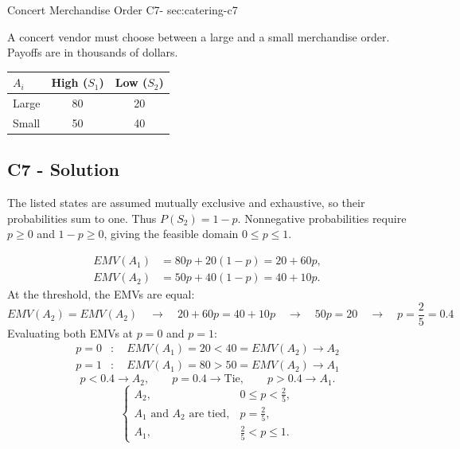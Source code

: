 \sectionScored
	{Concert Merchandise Order}
	{C7-}
	{sec:catering-c7}
	{
	\label{sec:c7-exam-solutions}
	A concert vendor must choose between a large and a small merchandise order. Payoffs are in thousands of dollars.
		\begin{center}\setlength{\tabcolsep}{4pt}\renewcommand{\arraystretch}{1.15}
			\begin{tabular}{lcc}\toprule
			$A_i$&High ($S_1$)&Low ($S_2$)\\ \midrule
			Large &80&20\\
			Small &50&40\\ \bottomrule
			\end{tabular}
		\end{center}


	\label{subsec:catering-c7-solution}
	\subsection*{C7 - Solution }
	
	The listed states are assumed mutually exclusive and exhaustive, so their probabilities sum to one. Thus $P(S_2)=1-p$. Nonnegative probabilities require $p\ge0$ and $1-p\ge0$, giving the feasible domain $0\le p\le1$.

		\begin{align*}
EMV(A_1)&=80p+20(1-p)=20+60p,\\
			EMV(A_2)&=50p+40(1-p)=40+10p.
		\end{align*}
		At the threshold, the EMVs are equal:
		\[
		EMV(A_2) = EMV(A_2) 
		\quad \longrightarrow \quad 
		20+60p=40+10p
		\quad \longrightarrow \quad  
		50p=20
		\quad \longrightarrow \quad  
		p=\frac{2}{5}=0.4
		\]
		Evaluating both EMVs at $p=0$ and $p=1$:
		\[
		\begin{aligned}
			p=0 &: \quad
			EMV(A_1)=20 < 40=EMV(A_2)
			\longrightarrow A_2\\
			p=1 &: \quad
			EMV(A_1)=80 > 50=EMV(A_2)
			\longrightarrow A_1
		\end{aligned}
		\]
		\[
		p<0.4 \longrightarrow A_2,\qquad
		p=0.4 \longrightarrow \text{Tie},\qquad
		p>0.4 \longrightarrow A_1.
		\]
		\[
		\boxed{\begin{cases}
				A_2,&0\le p<\frac{2}{5},\\
				A_1\text{ and }A_2\text{ are tied},&p=\frac{2}{5},\\
				A_1,&\frac{2}{5}<p\le1.
		\end{cases}}
		\]

	}

